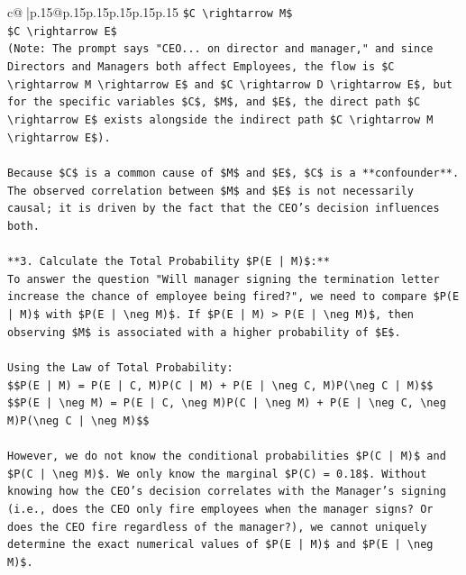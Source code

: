 \documentclass{article}
\begin{document}
{\begin{supertabular}{c@{$\;$}|p{.15\linewidth}@{}p{.15\linewidth}p{.15\linewidth}p{.15\linewidth}p{.15\linewidth}p{.15\linewidth}}
{{{\texttt{\$C \textbackslash{}rightarrow M\$} \\
\texttt{\$C \textbackslash{}rightarrow E\$} \\
\texttt{(Note: The prompt says "CEO... on director and manager," and since Directors and Managers both affect Employees, the flow is \$C \textbackslash{}rightarrow M \textbackslash{}rightarrow E\$ and \$C \textbackslash{}rightarrow D \textbackslash{}rightarrow E\$, but for the specific variables \$C\$, \$M\$, and \$E\$, the direct path \$C \textbackslash{}rightarrow E\$ exists alongside the indirect path \$C \textbackslash{}rightarrow M \textbackslash{}rightarrow E\$).} \\
\\ 
\texttt{Because \$C\$ is a common cause of \$M\$ and \$E\$, \$C\$ is a **confounder**. The observed correlation between \$M\$ and \$E\$ is not necessarily causal; it is driven by the fact that the CEO's decision influences both.} \\
\\ 
\texttt{**3. Calculate the Total Probability \$P(E | M)\$:**} \\
\texttt{To answer the question "Will manager signing the termination letter increase the chance of employee being fired?", we need to compare \$P(E | M)\$ with \$P(E | \textbackslash{}neg M)\$. If \$P(E | M) > P(E | \textbackslash{}neg M)\$, then observing \$M\$ is associated with a higher probability of \$E\$.} \\
\\ 
\texttt{Using the Law of Total Probability:} \\
\texttt{\$\$P(E | M) = P(E | C, M)P(C | M) + P(E | \textbackslash{}neg C, M)P(\textbackslash{}neg C | M)\$\$} \\
\texttt{\$\$P(E | \textbackslash{}neg M) = P(E | C, \textbackslash{}neg M)P(C | \textbackslash{}neg M) + P(E | \textbackslash{}neg C, \textbackslash{}neg M)P(\textbackslash{}neg C | \textbackslash{}neg M)\$\$} \\
\\ 
\texttt{However, we do not know the conditional probabilities \$P(C | M)\$ and \$P(C | \textbackslash{}neg M)\$. We only know the marginal \$P(C) = 0.18\$. Without knowing how the CEO's decision correlates with the Manager's signing (i.e., does the CEO only fire employees when the manager signs? Or does the CEO fire regardless of the manager?), we cannot uniquely determine the exact numerical values of \$P(E | M)\$ and \$P(E | \textbackslash{}neg M)\$.} \\
\\ 
}}}
\end{supertabular}}
\end{document}
